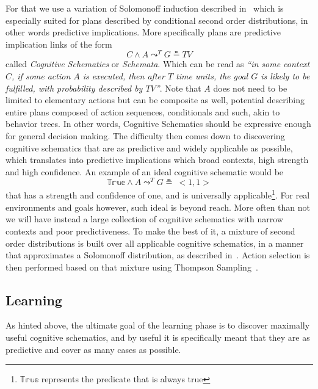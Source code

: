 \documentclass[runningheads]{llncs}
\newcommand{\lpreimp}[1]{\leadsto^{#1}}
\begin{document}
For that we use a variation of Solomonoff induction described
in~\cite{Geisweiller2018} which is especially suited for plans
described by conditional second order distributions, in other words
predictive implications.  More specifically plans are predictive
implication links of the form
$$C \land A \lpreimp{T} G \measeq \textit{TV}$$
called \emph{Cognitive Schematics} or \emph{Schemata}.  Which can be
read as \emph{``in some context $C$, if some action $A$ is executed,
  then after $T$ time units, the goal $G$ is likely to be fulfilled,
  with probability described by $\textit{TV}$''}.  Note that $A$ does
not need to be limited to elementary actions but can be composite as
well, potential describing entire plans composed of action sequences,
conditionals and such, akin to behavior trees.  In other words,
Cognitive Schematics should be expressive enough for general decision
making.
The difficulty then comes down to discovering cognitive schematics
that are as predictive and widely applicable as possible, which
translates into predictive implications which broad contexts, high
strength and high confidence.  An example of an ideal cognitive
schematic would be
$$\mathbb{True} \land A \lpreimp{T} G \measeq\ <\! 1, 1\! >$$
that has a strength and confidence of one, and is universally
applicable\footnote{$\mathbb{True}$ represents the predicate that is
  always true}.  For real environments and goals however, such ideal
is beyond reach.  More often than not we will have instead a large
collection of cognitive schematics with narrow contexts and poor
predictiveness.  To make the best of it, a mixture of second order
distributions is built over all applicable cognitive schematics, in a
manner that approximates a Solomonoff distribution, as described
in~\cite{Geisweiller2018}.  Action selection is then performed based
on that mixture using Thompson Sampling~\cite{Leike2016}.

\subsection{Learning}
As hinted above, the ultimate goal of the learning phase is to
discover maximally useful cognitive schematics, and by useful it is
specifically meant that they are as predictive and cover as many cases
as possible.
\end{document}
